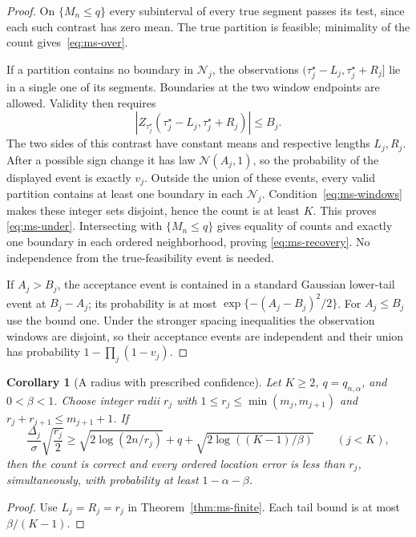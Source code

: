 \documentclass[pdflatex,sn-mathphys-num]{sn-jnl}
\newcommand{\taus}{\tau^\star}
\theoremstyle{thmstyleone}
\newtheorem{corollary}[theorem]{Corollary}
\theoremstyle{thmstyletwo}
\begin{document}
\begin{proof}
On $\{M_n\le q\}$ every subinterval of every true segment passes its
test, since each such contrast has zero mean. The true partition is feasible;
minimality of the count gives~\eqref{eq:ms-over}.

If a partition contains no boundary in $\mathcal N_j$, the observations
$(\taus_j-L_j,\taus_j+R_j]$ lie in a single one of its segments.
Boundaries at the two window endpoints are allowed. Validity then requires
\[
|Z_{\taus_j}(\taus_j-L_j,\taus_j+R_j)|\le B_j.
\]
The two sides of this contrast have constant means and respective lengths
$L_j,R_j$. After a possible sign change it has law $\mathcal N(A_j,1)$,
so the probability of the displayed event is exactly $v_j$.
Outside the union of these events, every valid partition contains at least
one boundary in each $\mathcal N_j$. Condition~\eqref{eq:ms-windows} makes
these integer sets disjoint, hence the count is at least $K$. This proves
\eqref{eq:ms-under}. Intersecting with $\{M_n\le q\}$ gives equality of
counts and exactly one boundary in each ordered neighborhood, proving
\eqref{eq:ms-recovery}. No independence from the true-feasibility event
is needed.

If $A_j>B_j$, the acceptance event is contained in a standard Gaussian
lower-tail event at $B_j-A_j$; its probability is at most
$\exp\{-(A_j-B_j)^2/2\}$. For $A_j\le B_j$ use the bound one.
Under the stronger spacing inequalities the observation windows are
disjoint, so their acceptance events are independent and their union
has probability $1-\prod_j(1-v_j)$.
\end{proof}

\begin{corollary}[A radius with prescribed confidence]\label{cor:ms-radius}
Let $K\ge2$, $q=q_{n,\alpha}$, and $0<\beta<1$. Choose integer radii $r_j$
with $1\le r_j\le\min(m_j,m_{j+1})$ and
$r_j+r_{j+1}\le m_{j+1}+1$. If
\begin{equation}\label{eq:ms-radius}
\frac{\Delta_j}{\sigma}\sqrt{\frac{r_j}{2}}
\ge \sqrt{2\log(2n/r_j)}+q+
\sqrt{2\log((K-1)/\beta)}\qquad(j<K),
\end{equation}
then the count is correct and every ordered location error is less than
$r_j$, simultaneously, with probability at least $1-\alpha-\beta$.
\end{corollary}
\begin{proof}
Use $L_j=R_j=r_j$ in Theorem~\ref{thm:ms-finite}. Each tail bound is at
most $\beta/(K-1)$.
\end{proof}
\end{document}
